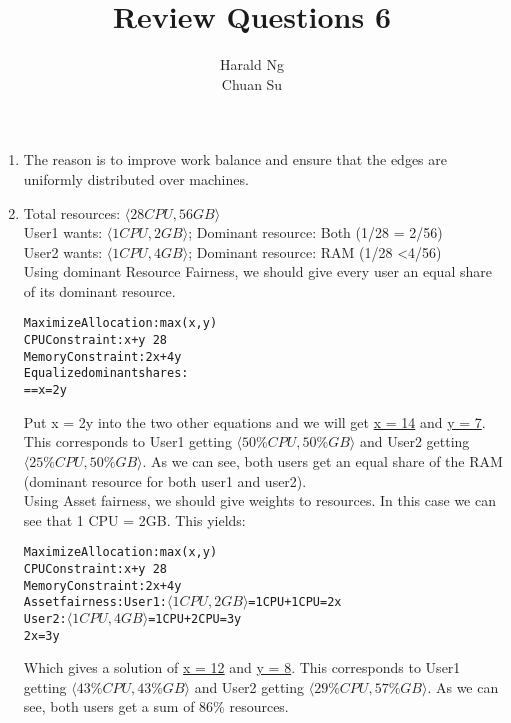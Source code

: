 \documentclass[12pt]{article}
\begin{document}
\title{Review Questions 6}
\author{Harald Ng \\
        Chuan Su}

\maketitle
\begin{enumerate}
    \item 
   	The reason is to improve work balance and ensure that the edges are uniformly distributed over machines.
    \item Total resources: \(\langle28CPU, 56GB\rangle\) \\
	User1 wants: \(\langle1CPU, 2GB\rangle\); Dominant resource: Both (1/28 = 2/56) \\
	User2 wants: \(\langle1CPU, 4GB\rangle\); Dominant resource: RAM (1/28 \textless 4/56) \\
	Using dominant Resource Fairness, we should give every user an equal share of its dominant resource.
	\begin{alltt}
	    Maximize Allocation:    max(x,y)        
    CPU Constraint:         x+y \leq\ 28        
    Memory Constraint:      2x + 4y  
    Equalize dominant shares:
     =  \leftrightarrow {} =  \leftrightarrow x = 2y
	\end{alltt}
	 Put x = 2y into the two other equations and we will get \underline{x = 14} and \underline{y = 7}. This corresponds to User1 getting \(\langle50\% CPU, 50\%GB\rangle\) and User2 getting \(\langle25\% CPU, 50\%GB\rangle\). As we can see, both users get an equal share of the RAM (dominant resource for both user1 and user2).
	 \\
	 Using Asset fairness, we should give weights to resources. In this case we can see that 1 CPU = 2GB. This yields:
	 	\begin{alltt}
	    Maximize Allocation:    max(x,y)        
    CPU Constraint:         x+y \leq\ 28        
    Memory Constraint:      2x + 4y  
    Asset fairness:         User1: \(\langle1CPU, 2GB\rangle\) = 1CPU + 1CPU = 2x
                            User2: \(\langle1CPU, 4GB\rangle\) = 1CPU + 2CPU = 3y
                            \rightarrow 2x = 3y
	\end{alltt}
	Which gives a solution of \underline{x = 12} and \underline{y = 8}. This corresponds to User1 getting \(\langle43\% CPU, 43\%GB\rangle\) and User2 getting \(\langle29\% CPU, 57\%GB\rangle\). As we can see, both users get a sum of 86\% resources.
	
	






\end{enumerate}
\end{document}
